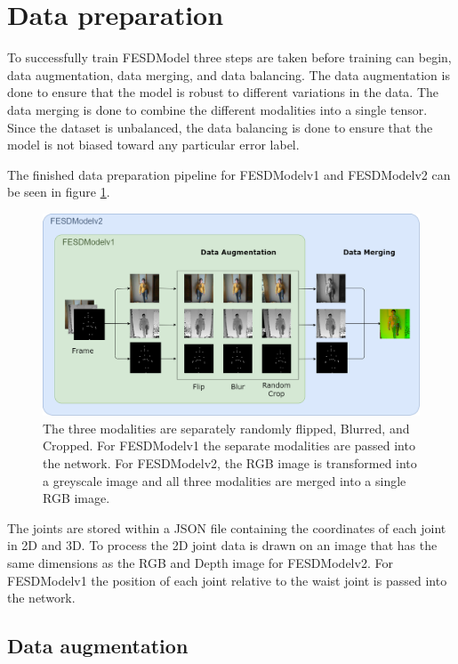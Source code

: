 \section{Data preparation}
\label{sec:data_preparation}

To successfully train FESDModel three steps are taken before training can begin, data augmentation, data merging, and data balancing. The data augmentation is done to ensure that the model is robust to different variations in the data. The data merging is done to combine the different modalities into a single tensor. Since the dataset is unbalanced, the data balancing is done to ensure that the model is not biased toward any particular error label. 

The finished data preparation pipeline for FESDModelv1 and FESDModelv2 can be seen in figure \ref{fig:data_preparation_pipeline}.

\begin{figure}[ht]
  \centering
  \includegraphics[width=\linewidth]{figures/ProcessingPipeline/DataProcessing.png}
  \caption[Data preparation pipeline for FESDModel]{The three modalities are separately randomly flipped, Blurred, and Cropped. For FESDModelv1 the separate modalities are passed into the network. For FESDModelv2, the RGB image is transformed into a greyscale image and all three modalities are merged into a single RGB image.}
  \label{fig:data_preparation_pipeline}
\end{figure}

The joints are stored within a JSON file containing the coordinates of each joint in 2D and 3D. To process the 2D joint data is drawn on an image that has the same dimensions as the RGB and Depth image for FESDModelv2. For FESDModelv1 the position of each joint relative to the waist joint is passed into the network.

\subsection{Data augmentation}


